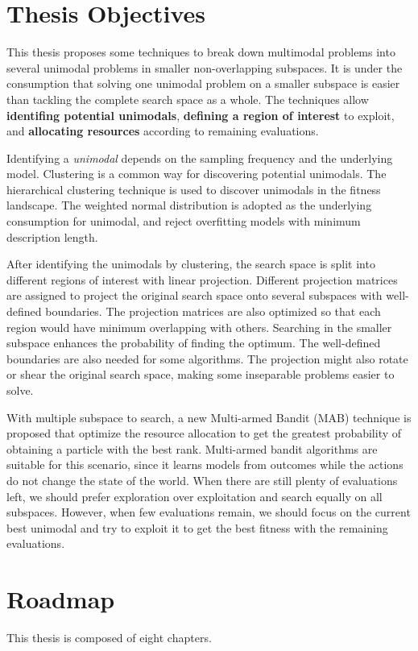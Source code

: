 \section{Thesis Objectives}
This thesis proposes some techniques to break down multimodal problems into several unimodal problems in smaller non-overlapping subspaces.
It is under the consumption that solving one unimodal problem on a smaller subspace is easier than tackling the complete search space as a whole.
The techniques allow \textbf{identifing potential unimodals},
\textbf{defining a region of interest} to exploit, 
and \textbf{allocating resources} according to remaining evaluations.

Identifying a \textit{unimodal} depends on the sampling frequency and the underlying model.
Clustering is a common way for discovering potential unimodals.
The hierarchical clustering technique is used to discover unimodals in the fitness landscape.
The weighted normal distribution is adopted as the underlying consumption for unimodal, and reject overfitting models with minimum description length.

After identifying the unimodals by clustering, the search space is split into different regions of interest with linear projection.
Different projection matrices are assigned to project the original search space onto several subspaces with well-defined boundaries.
The projection matrices are also optimized so that each region would have minimum overlapping with others.
Searching in the smaller subspace enhances the probability of finding the optimum.
The well-defined boundaries are also needed for some algorithms.
The projection might also rotate or shear the original search space, making some inseparable problems easier to solve.

With multiple subspace to search, a new Multi-armed Bandit (MAB) technique is proposed
that optimize the resource allocation to get the greatest probability of obtaining a particle with the best rank.
Multi-armed bandit algorithms are suitable for this scenario, 
since it learns models from outcomes while the actions do not change the state of the world.
When there are still plenty of evaluations left, we should prefer exploration over exploitation and search equally on all subspaces.
However, when few evaluations remain, we should focus on the current best unimodal 
and try to exploit it to get the best fitness with the remaining evaluations.  


\section{Roadmap}
This thesis is composed of eight chapters.

